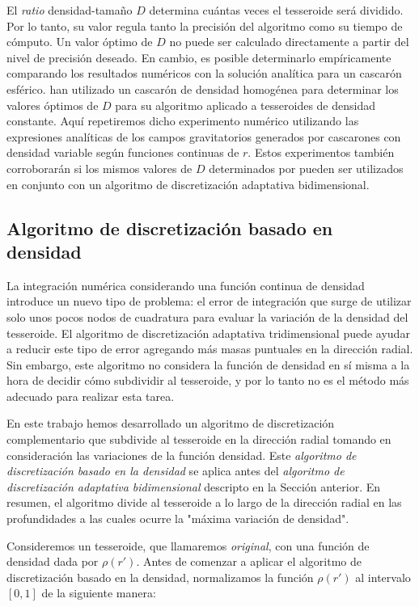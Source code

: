 El \emph{ratio} densidad-tamaño $D$ determina cuántas veces el tesseroide será
dividido.
Por lo tanto, su valor regula tanto la precisión del algoritmo como su tiempo
de cómputo.
Un valor óptimo de $D$ no puede ser calculado directamente a partir del nivel
de precisión deseado.
En cambio, es posible determinarlo empíricamente comparando los resultados
numéricos con la solución analítica para un cascarón esférico.
\citet{uieda2016} han utilizado un cascarón de densidad homogénea para
determinar los valores óptimos de $D$ para su algoritmo aplicado a tesseroides
de densidad constante.
Aquí repetiremos dicho experimento numérico utilizando las expresiones
analíticas de los campos gravitatorios generados por cascarones con densidad
variable según funciones continuas de $r$.
Estos experimentos también corroborarán si los mismos valores de $D$
determinados por \citet{uieda2016} pueden ser utilizados en conjunto con un
algoritmo de discretización adaptativa bidimensional.


\subsection{Algoritmo de discretización basado en densidad}

La integración numérica considerando una función continua de densidad introduce
un nuevo tipo de problema: el error de integración que surge de utilizar solo
unos pocos nodos de cuadratura para evaluar la variación de la densidad del
tesseroide.
El algoritmo de discretización adaptativa tridimensional puede ayudar a reducir
este tipo de error agregando más masas puntuales en la dirección radial.
Sin embargo, este algoritmo no considera la función de densidad en sí misma
a la hora de decidir cómo subdividir al tesseroide, y por lo tanto no es el
método más adecuado para realizar esta tarea.

En este trabajo hemos desarrollado un algoritmo de discretización
complementario que subdivide al tesseroide en la dirección radial tomando en
consideración las variaciones de la función densidad.
Este \emph{algoritmo de discretización basado en la densidad} se aplica antes
del \emph{algoritmo de discretización adaptativa bidimensional} descripto en la
Sección anterior.
En resumen, el algoritmo divide al tesseroide a lo largo de la dirección radial
en las profundidades a las cuales ocurre la "máxima variación de densidad".

Consideremos un tesseroide, que llamaremos \emph{original}, con una función de
densidad dada por $\rho(r')$.
Antes de comenzar a aplicar el algoritmo de discretización basado en la
densidad, normalizamos la función $\rho(r')$ al intervalo $[0, 1]$ de la
siguiente manera:

